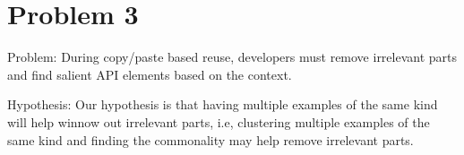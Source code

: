 \section{Problem 3}
Problem: During copy/paste based reuse, developers must remove irrelevant parts and find salient API elements based on the context. 

Hypothesis: Our hypothesis is that having multiple examples of the same kind will help winnow out irrelevant parts, i.e, clustering multiple examples of the same kind and finding the commonality may help remove irrelevant parts. 
























